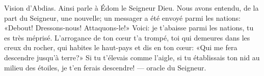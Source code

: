 Vision d’Abdias.
Ainsi parle à Édom le Seigneur Dieu.
Nous avons entendu, de la part du Seigneur, une nouvelle;
	un messager a été envoyé parmi les nations:
	«Debout! Dressons-nous! Attaquons-le!»
Voici: je t’abaisse parmi les nations, tu es très méprisé.
L’arrogance de ton cœur t’a trompé, toi qui demeures dans les creux du rocher,
	qui habites le haut-pays et dis en ton cœur:
	«Qui me fera descendre jusqu’à terre?»
Si tu t’élevais comme l’aigle, si tu établissais ton nid au milieu des étoiles,
	je t’en ferais descendre! --- oracle du Seigneur.
